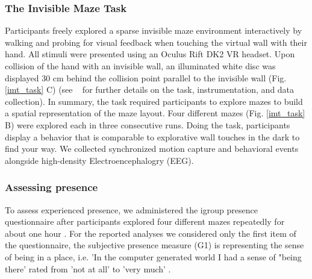 
\subsubsection{The Invisible Maze Task} Participants freely explored a sparse invisible maze environment interactively by walking and probing for visual feedback when touching the virtual wall with their hand. All stimuli were presented using an Oculus Rift DK2 VR headset.
Upon collision of the hand with an invisible wall, an illuminated white disc was displayed 30 cm behind the collision point parallel to the invisible wall (Fig. \ref{imt_task} C) (see ~\cite{Gehrke2018} for further details on the task, instrumentation, and data collection). In summary, the task required participants to explore mazes to build a spatial representation of the maze layout. Four different mazes (Fig. \ref{imt_task} B) were explored each in three consecutive runs. Doing the task, participants display a behavior that is comparable to explorative wall touches in the dark to find your way. We collected synchronized motion capture and behavioral events alongside high-density Electroencephalogry (EEG).

\subsubsection{Assessing presence} To assess experienced presence, we administered the igroup presence questionnaire after participants explored four different mazes repeatedly for about one hour \cite{Schubert2003}. For the reported analyses we considered only the first item of the questionnaire, the subjective presence measure (G1) is representing the sense of being in a place, i.e. 'In the computer generated world I had a sense of "being there' rated from 'not at all' to 'very much' \cite{Schubert2003, Slater1993}.